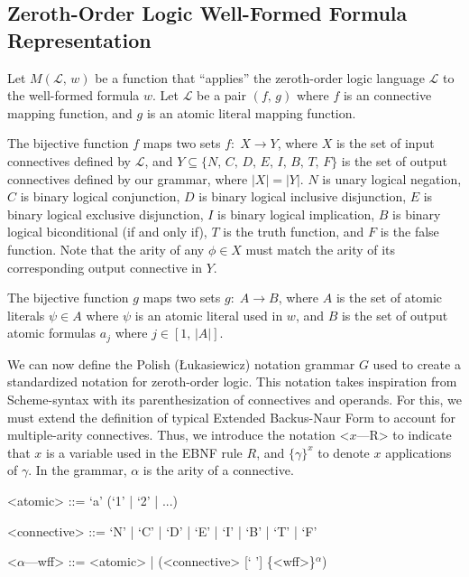 \documentclass[ms]{uncgdissertationexp2}
\theoremstyle{plain}
\theoremstyle{definition}
\theoremstyle{remark}
\begin{document}
    \subsection{Zeroth-Order Logic Well-Formed Formula Representation}
    Let $M(\mathcal{L},\,w)$ be a function that ``applies'' the zeroth-order logic language $\mathcal{L}$ to the well-formed formula $w$. Let $\mathcal{L}$ be a pair $(f,\,g)$ where $f$ is an connective mapping function, and $g$ is an atomic literal mapping function. 

    The bijective function $f$ maps two sets $f:\;X \to Y$, where $X$ is the set of input connectives defined by $\mathcal{L}$, and $Y \subseteq \{N,\,C,\,D,\,E,\,I,\,B,\,T,\,F\}$ is the set of output connectives defined by our grammar, where $|X| = |Y|$. $N$ is unary logical negation, $C$ is binary logical conjunction, $D$ is binary logical inclusive disjunction, $E$ is binary logical exclusive disjunction, $I$ is binary logical implication, $B$ is binary logical biconditional (if and only if), $T$ is the truth function, and $F$ is the false function. Note that the arity of any $\phi \in X$ must match the arity of its corresponding output connective in $Y$.

    The bijective function $g$ maps two sets $g:\;A \to B$, where $A$ is the set of atomic literals $\psi \in A$ where $\psi$ is an atomic literal used in $w$, and $B$ is the set of output atomic formulas $a_{j}$ where $j \in [1,\,|A|]$.

    We can now define the Polish (Łukasiewicz) notation grammar $G$ used to create a standardized notation for zeroth-order logic. This notation takes inspiration from Scheme-syntax with its parenthesization of connectives and operands. For this, we must extend the definition of typical Extended Backus-Naur Form to account for multiple-arity connectives. Thus, we introduce the notation \textless{$x$---R\textgreater} to indicate that $x$ is a variable used in the EBNF rule $R$, and $\{\gamma\}^{x}$ to denote $x$ applications of $\gamma$. In the grammar, $\alpha$ is the arity of a connective.
    \begin{grammar}
        <atomic> ::= `a' (`1' | `2' | ...)
        
        <connective> ::= `N' | `C' | `D' | `E' | `I' | `B' | `T' | `F' 
        
        <$\alpha$---wff> ::= <atomic> | (<connective> [` '] \{<wff>\}$^{\alpha}$)
    \end{grammar}
\end{document}
